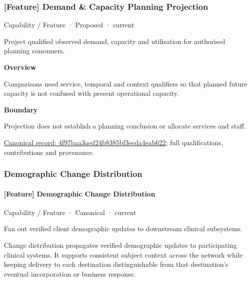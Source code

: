 \subsubsection{[Feature] Demand \& Capacity Planning Projection}

\label{element:4f97baa3aed24b8385bf3ecda4eab622}
{\small Capability / Feature · Proposed · current}\par

Project qualified observed demand, capacity and utilisation for authorised planning consumers.



\textbf{Overview}



Comparisons need service, temporal and context qualifiers so that planned future capacity is not confused with present operational capacity.



\textbf{Boundary}



Projection does not establish a planning conclusion or allocate services and staff.


{\footnotesize \href{../../../../continuum/strategy/capability/feature/4f97baa3aed24b8385bf3ecda4eab622.md}{Canonical record: 4f97baa3aed24b8385bf3ecda4eab622}; full qualifications, contributions and provenance.}\par
\subsubsection{Demographic Change Distribution}

\paragraph{[Feature] Demographic Change Distribution}

\label{element:bfd2ce654a79404dbef2694d30fb39fc}
{\small Capability / Feature · Canonical · current}\par

Fan out verified client demographic updates to downstream clinical subsystems.



Change distribution propagates verified demographic updates to participating clinical systems. It supports consistent subject context across the network while keeping delivery to each destination distinguishable from that destination's eventual incorporation or business response.


